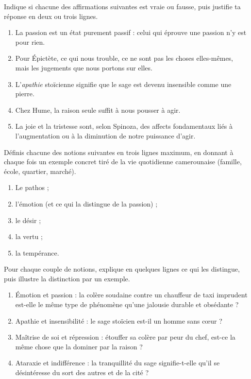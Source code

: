 \documentclass[11pt]{article}
\newcommand{\cle}[1]{{\popxbold\color{popdark}#1}}
\begin{document}
\begin{exercice}
Indique si chacune des affirmations suivantes est vraie ou fausse, puis justifie ta réponse en deux ou trois lignes.

\begin{enumerate}
\item La passion est un état purement passif : celui qui éprouve une passion n'y est pour rien.
\item Pour Épictète, ce qui nous trouble, ce ne sont pas les choses elles-mêmes, mais les jugements que nous portons sur elles.
\item L'\emph{apathie} stoïcienne signifie que le sage est devenu insensible comme une pierre.
\item Chez Hume, la raison seule suffit à nous pousser à agir.
\item La joie et la tristesse sont, selon Spinoza, des affects fondamentaux liés à l'augmentation ou à la diminution de notre puissance d'agir.
\end{enumerate}
\end{exercice}

\begin{exercice}
Définis chacune des notions suivantes en trois lignes maximum, en donnant à chaque fois un exemple concret tiré de la vie quotidienne camerounaise (famille, école, quartier, marché).
\begin{enumerate}
\item Le \cle{pathos} ;
\item l'\cle{émotion} (et ce qui la distingue de la passion) ;
\item le \cle{désir} ;
\item la \cle{vertu} ;
\item la \cle{tempérance}.
\end{enumerate}
\end{exercice}

\begin{exercice}
Pour chaque couple de notions, explique en quelques lignes ce qui les distingue, puis illustre la distinction par un exemple.
\begin{enumerate}
\item \cle{Émotion} et \cle{passion} : la colère soudaine contre un chauffeur de taxi imprudent est-elle le même type de phénomène qu'une jalousie durable et obsédante ?
\item \cle{Apathie} et \cle{insensibilité} : le sage stoïcien est-il un homme sans cœur ?
\item \cle{Maîtrise de soi} et \cle{répression} : étouffer sa colère par peur du chef, est-ce la même chose que la dominer par la raison ?
\item \cle{Ataraxie} et \cle{indifférence} : la tranquillité du sage signifie-t-elle qu'il se désintéresse du sort des autres et de la cité ?
\end{enumerate}
\end{exercice}
\end{document}
